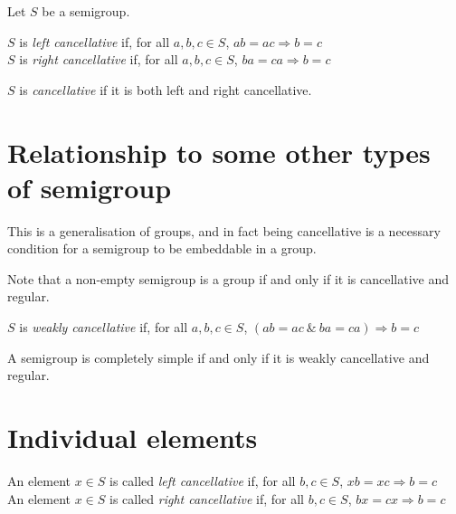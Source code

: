 \documentclass[12pt]{article}
\begin{document}
Let $S$ be a semigroup.

$S$ is \emph{left cancellative} if, for all $a,b,c\in S$, $ab=ac\Rightarrow b=c$\\
$S$ is \emph{right cancellative} if, for all $a,b,c\in S$, $ba=ca\Rightarrow b=c$

$S$ is \emph{cancellative} if it is both left and right cancellative.

\section{Relationship to some other types of semigroup}
This is a generalisation of groups, and in fact being cancellative is a necessary condition for a semigroup to be embeddable in a group.

Note that a non-empty semigroup is a group if and only if it is cancellative and regular.

$S$ is \emph{weakly cancellative} if, for all $a,b,c\in S$, $(ab=ac~\&~ba=ca)\Rightarrow b=c$

A semigroup is completely simple if and only if it is weakly cancellative and regular.

\section{Individual elements}
An element $x\in S$ is called \emph{left cancellative} if, for all $b,c\in S$, $xb=xc\Rightarrow b=c$\\
An element $x\in S$ is called \emph{right cancellative} if, for all $b,c\in S$, $bx=cx\Rightarrow b=c$
\end{document}
